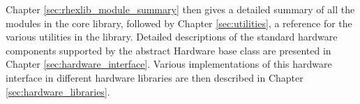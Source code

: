 Chapter \ref{sec:rhexlib_module_summary} then gives a detailed summary of
all the modules in the core library, followed by Chapter
\ref{sec:utilities}, a reference for the various utilities in the
library. Detailed descriptions of the standard hardware components supported
by the abstract Hardware base class are presented in Chapter
\ref{sec:hardware_interface}. Various implementations of this hardware
interface in different hardware libraries are then described in Chapter
\ref{sec:hardware_libraries}. 

